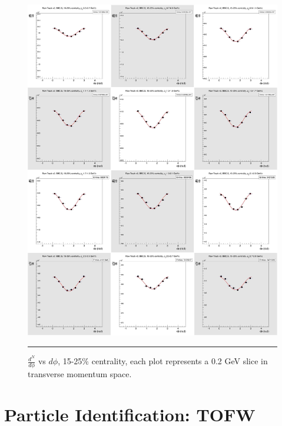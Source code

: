 \begin{figure}[htbp!]
  \centering
    \includegraphics[width=1\textwidth]{chargedtrackv2/htrkdphi2bbcs_3.jpg}
    \rule{35em}{0.5pt}
  \caption[$\frac{dN}{d\phi}$ vs $d\phi$, 15-25\% centrality.]{$\frac{d^N}{d\phi}$ vs $d\phi$, 15-25\% centrality, each plot represents a 0.2 GeV slice in transverse momentum space.}
  \label{fig:Ndphicent3}
\end{figure}

\section{Particle Identification: TOFW}

